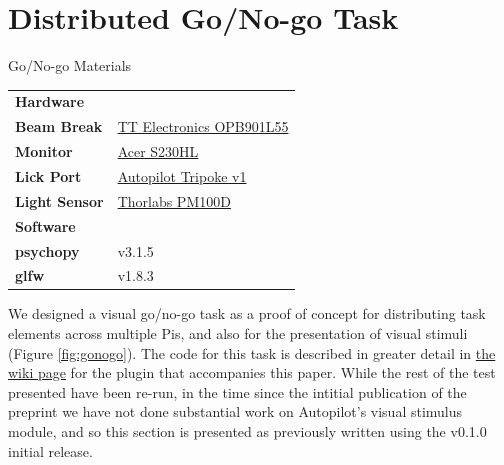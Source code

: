 \section{Distributed Go/No-go Task}
\label{sec:gonogo}

\begin{margintable}[0cm]
\caption{Go/No-go Materials}
\label{tab:gpiomaterials}
\noindent\begin{tabularx}{\linewidth}{lX}%
\toprule
\textbf{Hardware} & \\
\textbf{Beam Break} & \href{https://wiki.auto-pi-lot.com/index.php/TT_Electronics_OPB901L55}{TT Electronics OPB901L55} \\
\textbf{Monitor} & \href{https://www.productchart.com/monitors/16901}{Acer S230HL} \\
\textbf{Lick Port} & \href{https://wiki.auto-pi-lot.com/index.php/Autopilot_Tripoke}{Autopilot Tripoke v1} \\
\textbf{Light Sensor} & \href{https://www.thorlabs.com/newgrouppage9.cfm?objectgroup_id=3341}{Thorlabs PM100D} \\
\midrule
\textbf{Software} & \\
\textbf{psychopy} & v3.1.5 \\
\textbf{glfw} & v1.8.3 \\
\bottomrule
\end{tabularx}
\end{margintable}

We designed a visual go/no-go task as a proof of concept for distributing task elements across multiple Pis, and also for the presentation of visual stimuli (Figure \ref{fig:gonogo}). The code for this task is described in greater detail in \href{https://wiki.auto-pi-lot.com/index.php/Plugin:Autopilot_Paper}{the wiki page} for the plugin that accompanies this paper. While the rest of the test presented have been re-run, in the time since the intitial publication of the preprint we have not done substantial work on Autopilot's visual stimulus module, and so this section is presented as previously written using the v0.1.0 initial release.

